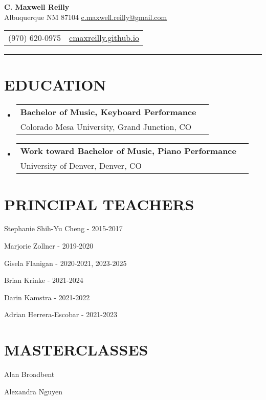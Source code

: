 \documentclass{article}
\makeatletter
\newcommand{\cvItem}[1]{
        \item {
            {#1}
        }
    }
\newcommand{\cvSubHeadingListStart}{\begin{itemize}[leftmargin=0pt]}
\newcommand{\cvSubHeadingListEnd}{\end{itemize}}
\newcommand{\cvItemListStart}{\begin{itemize}[leftmargin=10pt]}
\newcommand{\cvItemListEnd}{\end{itemize}}
\newcommand{\cvEducationSubheading}[2]{
        \vspace{-1pt}\item[]
            \begin{tabular*}{1\textwidth}[t]{l@{\extracolsep{\fill}}r}
                \textbf{#1} \\
                {#2} \\
            \end{tabular*}
    }
\makeatother
\begin{document}
    \begin{center}
        \textbf{\Large C. Maxwell Reilly} \\ Albuquerque NM 87104
        \href{mailto:c.maxwell.reilly@gmail.com}{c.maxwell.reilly@gmail.com}
    \end{center}\vspace{-11pt}
    \begin{center}
        \begin{tabular}{c c}
            (970) 620-0975 & \href{https://cmaxreilly.github.io}{cmaxreilly.github.io} \\
        \end{tabular}\vspace{-8pt}
    \end{center}
    \rule{\textwidth}{1pt}

    \section{EDUCATION}
        \cvSubHeadingListStart
            \cvEducationSubheading
                {Bachelor of Music, Keyboard Performance}
                {Colorado Mesa University, Grand Junction, CO}
            \cvEducationSubheading
                {Work toward Bachelor of Music, Piano Performance}
                {University of Denver, Denver, CO}
        \cvSubHeadingListEnd

    \section{PRINCIPAL TEACHERS}
        \cvItemListStart
            \begin{multicols}{2}
                \cvItem{Stephanie Shih-Yu Cheng - 2015-2017}
                \cvItem{Marjorie Zollner - 2019-2020}
                \cvItem{Gisela Flanigan - 2020-2021, 2023-2025} 
                \cvItem{Brian Krinke - 2021-2024}
                \cvItem{Darin Kamstra - 2021-2022}
                \cvItem{Adrian Herrera-Escobar - 2021-2023}
            \end{multicols}
        \cvItemListEnd

    \section{MASTERCLASSES}
        \cvItem{Alan Broadbent}
        \cvItem{Alexandra Nguyen}
\end{document}
